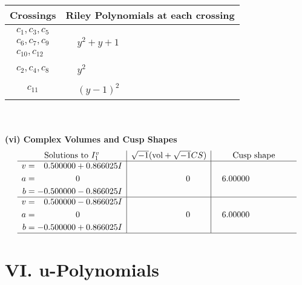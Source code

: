 \documentclass[1p]{elsarticle_modified}
\theoremstyle{definition}
\newcommand{\I}{\sqrt{-1}}
\begin{document}
\begin{tabular}{m{50pt}|m{274pt}}
Crossings & \hspace{64pt}Riley Polynomials at each crossing \\
\hline $$\begin{aligned}c_{1},c_{3},c_{5}\\c_{6},c_{7},c_{9}\\c_{10},c_{12}\end{aligned}$$&$\begin{aligned}
&y^2+y+1
\end{aligned}$\\
\hline $$\begin{aligned}c_{2},c_{4},c_{8}\end{aligned}$$&$\begin{aligned}
&y^2
\end{aligned}$\\
\hline $$\begin{aligned}c_{11}\end{aligned}$$&$\begin{aligned}
&(y-1)^2
\end{aligned}$\\
\hline
\end{tabular}\\~\\
\newpage\flushleft \textbf{(vi) Complex Volumes and Cusp Shapes}
$$\begin{array}{c|c|c}  
\text{Solutions to }I^v_{1}& \I (\text{vol} + \sqrt{-1}CS) & \text{Cusp shape}\\
 \hline 
\begin{aligned}
v &= \phantom{-}0.500000 + 0.866025 I \\
a &= \phantom{-0.000000 } 0 \\
b &= -0.500000 - 0.866025 I\end{aligned}
 & \phantom{-0.000000 } 0 & \phantom{-}6.00000\phantom{ +0.000000I} \\ \hline\begin{aligned}
v &= \phantom{-}0.500000 - 0.866025 I \\
a &= \phantom{-0.000000 } 0 \\
b &= -0.500000 + 0.866025 I\end{aligned}
 & \phantom{-0.000000 } 0 & \phantom{-}6.00000\phantom{ +0.000000I}\\
 \hline 
 \end{array}$$\newpage
\newpage\renewcommand{\arraystretch}{1}
\centering \section*{ VI. u-Polynomials}
\end{document}
